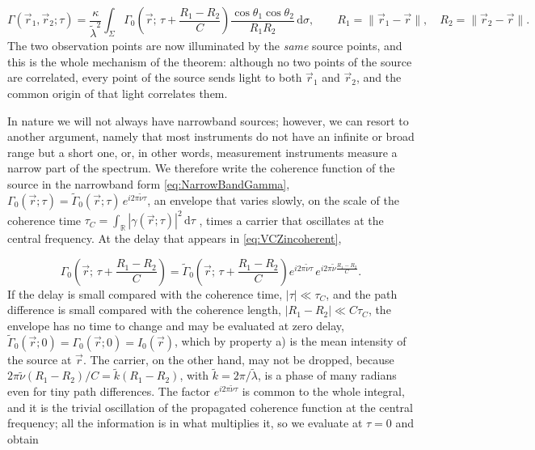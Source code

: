 		\begin{equation}\label{eq:VCZincoherent}
			\Gamma(\vec{r}_{1},\vec{r}_{2};\tau) = \frac{\kappa}{\tilde{\lambda}^{2}}\int_{\Sigma}\Gamma_{0}\left(\vec{r};\,\tau+\frac{R_{1}-R_{2}}{C}\right)\frac{\cos\theta_{1}\cos\theta_{2}}{R_{1}R_{2}}\,\mathrm{d}\sigma,
			\qquad R_{1}=\|\vec{r}_{1}-\vec{r}\|,\quad R_{2}=\|\vec{r}_{2}-\vec{r}\|.
		\end{equation}
		The two observation points are now illuminated by the \emph{same} source points, and this
		is the whole mechanism of the theorem: although no two points of the source are
		correlated, every point of the source sends light to both $\vec{r}_{1}$ and
		$\vec{r}_{2}$, and the common origin of that light correlates them.

		In nature we will not always have narrowband sources; however, we can resort to another
		argument, namely that most instruments do not have an infinite or broad range but a short
		one, or, in other words, measurement instruments measure a narrow part of the spectrum.
		We therefore write the coherence function of the source in the narrowband form
		\eqref{eq:NarrowBandGamma},
		$\Gamma_{0}(\vec{r};\tau)=\tilde{\Gamma}_{0}(\vec{r};\tau)\,e^{i2\pi\tilde{\nu}\tau}$, an
		envelope that varies slowly, on the scale of the coherence time
		$\tau_{C}=\int_{\mathbb{R}}|\gamma(\vec{r};\tau)|^{2}\,\mathrm{d}\tau$
		\citep{goodman2015statistical}, times a carrier that oscillates at the central frequency.
		At the delay that appears in \eqref{eq:VCZincoherent},

		\begin{equation}
			\Gamma_{0}\left(\vec{r};\,\tau+\frac{R_{1}-R_{2}}{C}\right) = \tilde{\Gamma}_{0}\left(\vec{r};\,\tau+\frac{R_{1}-R_{2}}{C}\right)e^{i2\pi\tilde{\nu}\tau}\,e^{i2\pi\tilde{\nu}\frac{R_{1}-R_{2}}{C}} .
		\end{equation}
		If the delay is small compared with the coherence time, $|\tau|\ll\tau_{C}$, and the path
		difference is small compared with the coherence length, $|R_{1}-R_{2}|\ll C\tau_{C}$,
		the envelope has no time to change and may be evaluated at zero delay,
		$\tilde{\Gamma}_{0}(\vec{r};0)=\Gamma_{0}(\vec{r};0)=I_{0}(\vec{r})$, which by property
		a) is the mean intensity of the source at $\vec{r}$. The carrier, on the other hand, may
		not be dropped, because $2\pi\tilde{\nu}(R_{1}-R_{2})/C=\tilde{k}(R_{1}-R_{2})$, with
		$\tilde{k}=2\pi/\tilde{\lambda}$, is a phase of many radians even for tiny path
		differences. The factor $e^{i2\pi\tilde{\nu}\tau}$ is common to the whole integral, and
		it is the trivial oscillation of the propagated coherence function at the central
		frequency; all the information is in what multiplies it, so we evaluate at $\tau=0$ and
		obtain


